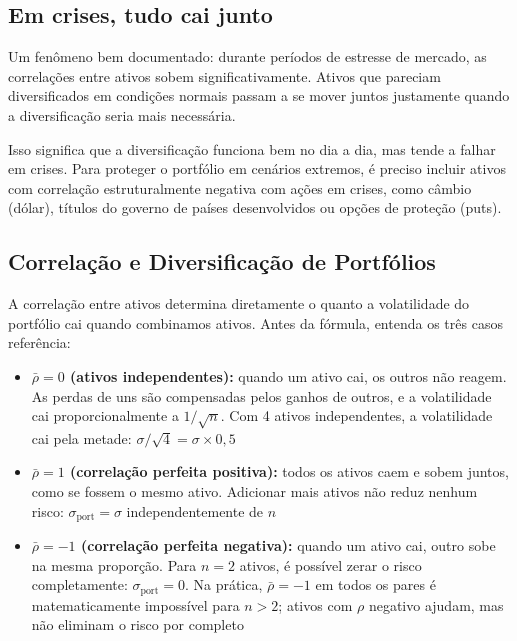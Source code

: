 \documentclass[11pt,a4paper]{article}
\theoremstyle{quant}
\begin{document}
\subsection{Em crises, tudo cai junto}

Um fenômeno bem documentado: durante períodos de estresse de mercado, as correlações
entre ativos sobem significativamente. Ativos que pareciam diversificados em condições
normais passam a se mover juntos justamente quando a diversificação seria mais necessária.

\begin{highlightbox}
  Isso significa que a diversificação funciona bem no dia a dia, mas tende a falhar
  em crises. Para proteger o portfólio em cenários extremos, é preciso incluir ativos
  com correlação estruturalmente negativa com ações em crises, como câmbio (dólar),
  títulos do governo de países desenvolvidos ou opções de proteção (puts).
\end{highlightbox}

\subsection{Correlação e Diversificação de Portfólios}

A correlação entre ativos determina diretamente o quanto a volatilidade do portfólio
cai quando combinamos ativos. Antes da fórmula, entenda os três casos referência:

\begin{itemize}
  \item \textbf{$\bar\rho = 0$ (ativos independentes):} quando um ativo cai, os outros
        não reagem. As perdas de uns são compensadas pelos ganhos de outros, e a
        volatilidade cai proporcionalmente a $1/\sqrt{n}$. Com 4 ativos independentes,
        a volatilidade cai pela metade: $\sigma/\sqrt{4} = \sigma \times 0{,}5$

  \item \textbf{$\bar\rho = 1$ (correlação perfeita positiva):} todos os ativos caem e
        sobem juntos, como se fossem o mesmo ativo. Adicionar mais ativos não reduz
        nenhum risco: $\sigma_\text{port} = \sigma$ independentemente de $n$

  \item \textbf{$\bar\rho = -1$ (correlação perfeita negativa):} quando um ativo cai,
        outro sobe na mesma proporção. Para $n = 2$ ativos, é possível zerar o risco
        completamente: $\sigma_\text{port} = 0$. Na prática, $\bar\rho = -1$ em todos
        os pares é matematicamente impossível para $n > 2$; ativos com $\rho$ negativo
        ajudam, mas não eliminam o risco por completo
\end{itemize}
\end{document}
